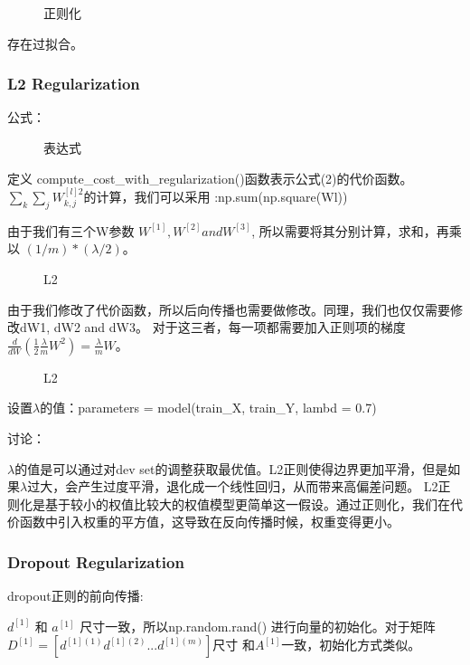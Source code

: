 \documentclass[UTF8]{ctexart}
\begin{document}
 \begin{figure}[htb]
  \caption{正则化}
   \label{fig:18}
  \end{figure}

存在过拟合。

\subsubsection{L2 Regularization}
公式：
\begin{figure}[htb]
 \caption{表达式}
  \label{fig:19}
 \end{figure}

 定义 compute\_cost\_with\_regularization()函数表示公式(2)的代价函数。
 $\sum_{k}\sum_{j}W_{k,j}^{[l]2}$的计算，我们可以采用 :np.sum(np.square(Wl))

由于我们有三个W参数 $W^{[1]}, W^{[2]} and W^{[3]}$, 所以需要将其分别计算，求和，再乘以 $(1/m)*(\lambda/2)$。
\begin{figure}[htb]
 \caption{L2}
  \label{fig:20}
 \end{figure}

由于我们修改了代价函数，所以后向传播也需要做修改。同理，我们也仅仅需要修改dW1, dW2 and dW3。
对于这三者，每一项都需要加入正则项的梯度$\frac{d}{dW}(\frac{1}{2}\frac{\lambda}{m}W^2)=\frac{\lambda}{m}W$。

\begin{figure}[htb]
 \caption{L2}
  \label{fig:21}
 \end{figure}

设置$\lambda$的值：parameters = model(train\_X, train\_Y, lambd = 0.7)

 讨论：

$\lambda$的值是可以通过对dev set的调整获取最优值。L2正则使得边界更加平滑，但是如果$\lambda$过大，会产生过度平滑，退化成一个线性回归，从而带来高偏差问题。
 L2正则化是基于较小的权值比较大的权值模型更简单这一假设。通过正则化，我们在代价函数中引入权重的平方值，这导致在反向传播时候，权重变得更小。

\subsubsection{Dropout Regularization}
dropout正则的前向传播:

$d^{[1]}$ 和 $a^{[1]}$ 尺寸一致，所以np.random.rand() 进行向量的初始化。对于矩阵 $D^{[1]}=[d^{[1](1)}d^{[1](2)}...d^{[1](m)}]$尺寸
和$A^{[1]}$一致，初始化方式类似。
\end{document}
